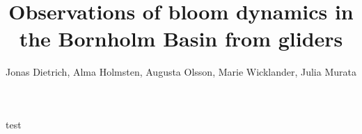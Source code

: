 \documentclass{article}
\title{Observations of bloom dynamics in the Bornholm Basin from gliders}
\author{Jonas Dietrich, Alma Holmsten, Augusta Olsson, Marie Wicklander, Julia Murata}
\begin{document}
\begin{titlepage}
  \maketitle
  \thispagestyle{empty}
\end{titlepage}


test\cite{Cauchy20182305}





\printbibliography


\end{document}
